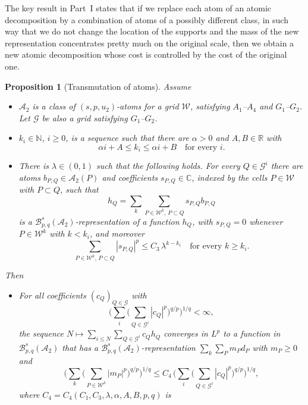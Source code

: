 \documentclass[11pt]{amsart}
\newtheorem{proposition}[theorem]{Proposition}
\theoremstyle{definition}
\begin{document}
The key result in Part~I states that if we replace each atom of an atomic
decomposition by a combination of atoms of a possibly different class, in
such way that we do not change the location of the supports and the mass of
the new representation concentrates pretty much on the original scale, then
we obtain a new atomic decomposition whose cost is controlled by the cost of
the original one.

\begin{proposition}[Transmutation of atoms]\label{trans}
Assume
\begin{itemize}
\item[{\bf I.}] $\mathcal{A}_2$ is a class of $(s,p,u_2)$-atoms for a grid
$\mathcal{W}$, satisfying $A_1$--$A_4$ and $G_1$--$G_2$. Let $\mathcal{G}$ be
also a grid satisfying $G_1$--$G_2$.
\item[{\bf II.}] $k_i\in \mathbb{N}$, $i\geq 0$, is a sequence such that there
are $\alpha>0$ and $A,B\in \mathbb{R}$ with
$$ \alpha i +A \leq k_i\leq \alpha i +B \quad\text{for every } i.$$
\item[{\bf III.}] There is $\lambda \in(0,1)$ such that the following holds.
For every $Q\in \mathcal{G}^i$ there are atoms $b_{P,Q} \in \mathcal{A}_2(P)$
and coefficients $s_{P,Q}\in \mathbb{C}$, indexed by the cells
$P \in \mathcal{W}$ with $P\subset Q$, such that
$$h_Q=\sum_k \sum_{P\in \mathcal{W}^k,\, P\subset Q} s_{P,Q} b_{P,Q}$$
is a $\mathcal{B}^s_{p,q}(\mathcal{A}_2)$-representation of a function $h_Q$,
with $s_{P,Q}=0$ whenever $P \in \mathcal{W}^k$ with $k < k_i$, and moreover
\begin{equation}\label{ad} \sum_{P\in \mathcal{W}^k,\, P \subset Q} |s_{P,Q}|^p \leq C_3\, \lambda^{k-k_i}
\quad\text{for every } k\geq k_i.\end{equation}
\end{itemize}
Then
\begin{itemize}
\item[{\bf A.}] For all coefficients $(c_Q)_{Q\in \mathcal{G}}$ with
$$\big( \sum_i \big( \sum_{Q\in \mathcal{G}^i} |c_{Q}|^p \big)^{q/p}\big)^{1/q}<\infty,$$
the sequence $N\mapsto \sum_{i\leq N} \sum_{Q\in \mathcal{G}^i }c_Q h_Q$
converges in $L^p$ to a function in $\mathcal{B}^s_{p,q}(\mathcal{A}_2)$ that
has a $\mathcal{B}^s_{p,q}(\mathcal{A}_2)$-representation
$\sum_k \sum_{P}m_P d_P$ with $m_P \geq 0$ and
$$\big(\sum_k \big( \sum_{P \in \mathcal{W}^k} |m_{P}|^p \big)^{q/p}\big)^{1/q}
\leq C_4\, \big( \sum_i \big( \sum_{Q\in \mathcal{G}^i} |c_{Q}|^p \big)^{q/p}\big)^{1/q},$$
where $C_4=C_4(C_1,C_3,\lambda,\alpha,A,B,p,q)$ is

\end{itemize}
\end{proposition}
\end{document}
